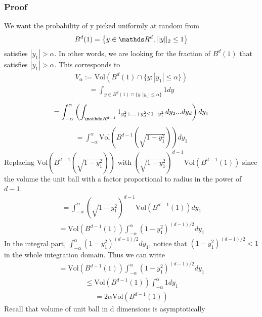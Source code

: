 \documentclass[a4paper, english, headtopline=0.08em, headsepline=0.04em, left = 1cm, right = 1cm, DIV=15]{article}
\begin{document}
\subsubsection*{Proof}
We want the probability of y picked uniformly at random from
\begin{align*}
	B^d(1)=\left\{y\in\RR^d,||y||_2 \leq 1\right\}
\end{align*}	
satisfies $|y_1|>\alpha$. In other words, we are looking for the fraction of $B^d(1)$ that satisfies $|y_1|>\alpha$.
This corresponds to
\begin{align*}
	V_{\alpha}:=\text{Vol}(B^d(1) \cap \{y : |y_1| \leq \alpha\})
\end{align*}
\begin{align*}
	=\int_{y\in B^d(1) \cap \{y : |y_1| \leq \alpha\}}1dy
\end{align*}
\begin{align*}
	=\int_{-\alpha}^{\alpha} \left(\int_{\RR^{d-1}} 1_{y_2^2+...+y_d^2\leq 1-y_1^2}\,dy_2...dy_d\right)dy_1
\end{align*}
\begin{align*}
=\int_{-\alpha}^{\alpha} \text{Vol}\left(B^{d-1}\left(\sqrt{1-y_1^2}\right)\right)dy_1
\end{align*}
Replacing $\text{Vol}\left(B^{d-1}\left(\sqrt{1-y_1^2}\right)\right)$ with $(\sqrt{1-y_1^2})^{d-1}\text{Vol}\left(B^{d-1}(1)\right)$ since the volume the unit ball with a factor proportional to radius in the power of $d-1$.
\begin{align*}
	=\int_{-\alpha}^{\alpha} (\sqrt{1-y_1^2})^{d-1}\text{Vol}\left(B^{d-1}(1)\right)dy_1
\end{align*}
\begin{align*}
	=\text{Vol}\left(B^{d-1}(1)\right)\int_{-\alpha}^{\alpha} (1-y_1^2)^{(d-1)/2}dy_1
\end{align*}
In the integral part, $\int_{-\alpha}^{\alpha} (1-y_1^2)^{(d-1)/2}dy_1$, notice that $(1-y_1^2)^{(d-1)/2}<1$ in the whole integration domain.
Thus we can write
\begin{align*}
	=\text{Vol}\left(B^{d-1}(1)\right)\int_{-\alpha}^{\alpha} (1-y_1^2)^{(d-1)/2}dy_1
\end{align*}
\begin{align*}
	\leq \text{Vol}\left(B^{d-1}(1)\right)\int_{-\alpha}^{\alpha} 1dy_1
\end{align*}
\begin{align*}
	=2\alpha \text{Vol}\left(B^{d-1}(1)\right)
\end{align*}
Recall that volume of unit ball in d dimensions is asymptotically
\end{document}

